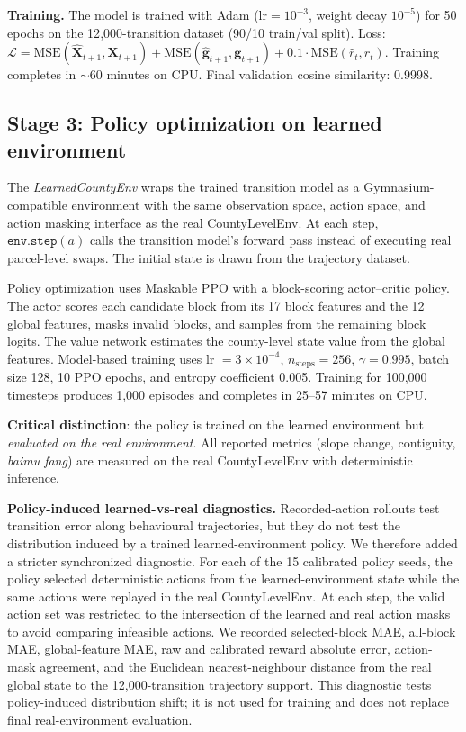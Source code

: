 \documentclass[11pt]{article}
\begin{document}
\textbf{Training.} The model is trained with Adam ($\text{lr} = 10^{-3}$, weight decay $10^{-5}$) for 50 epochs on the 12{,}000-transition dataset (90/10 train/val split). Loss: $\mathcal{L} = \text{MSE}(\hat{\mathbf{X}}_{t+1}, \mathbf{X}_{t+1}) + \text{MSE}(\hat{\mathbf{g}}_{t+1}, \mathbf{g}_{t+1}) + 0.1 \cdot \text{MSE}(\hat{r}_t, r_t)$. Training completes in $\sim$60 minutes on CPU. Final validation cosine similarity: 0.9998.

\subsection{Stage 3: Policy optimization on learned environment}

The \textit{LearnedCountyEnv} wraps the trained transition model as a Gymnasium-compatible environment with the same observation space, action space, and action masking interface as the real CountyLevelEnv. At each step, $\texttt{env.step}(a)$ calls the transition model's forward pass instead of executing real parcel-level swaps. The initial state is drawn from the trajectory dataset.

Policy optimization uses Maskable PPO with a block-scoring actor--critic policy. The actor scores each candidate block from its 17 block features and the 12 global features, masks invalid blocks, and samples from the remaining block logits. The value network estimates the county-level state value from the global features. Model-based training uses lr $= 3 \times 10^{-4}$, $n_\text{steps} = 256$, $\gamma = 0.995$, batch size 128, 10 PPO epochs, and entropy coefficient 0.005. Training for 100{,}000 timesteps produces 1{,}000 episodes and completes in 25--57 minutes on CPU.

\textbf{Critical distinction}: the policy is trained on the learned environment but \textit{evaluated on the real environment}. All reported metrics (slope change, contiguity, \textit{baimu fang}) are measured on the real CountyLevelEnv with deterministic inference.

\textbf{Policy-induced learned-vs-real diagnostics.} Recorded-action rollouts test transition error along behavioural trajectories, but they do not test the distribution induced by a trained learned-environment policy. We therefore added a stricter synchronized diagnostic. For each of the 15 calibrated policy seeds, the policy selected deterministic actions from the learned-environment state while the same actions were replayed in the real CountyLevelEnv. At each step, the valid action set was restricted to the intersection of the learned and real action masks to avoid comparing infeasible actions. We recorded selected-block MAE, all-block MAE, global-feature MAE, raw and calibrated reward absolute error, action-mask agreement, and the Euclidean nearest-neighbour distance from the real global state to the 12{,}000-transition trajectory support. This diagnostic tests policy-induced distribution shift; it is not used for training and does not replace final real-environment evaluation.
\end{document}
